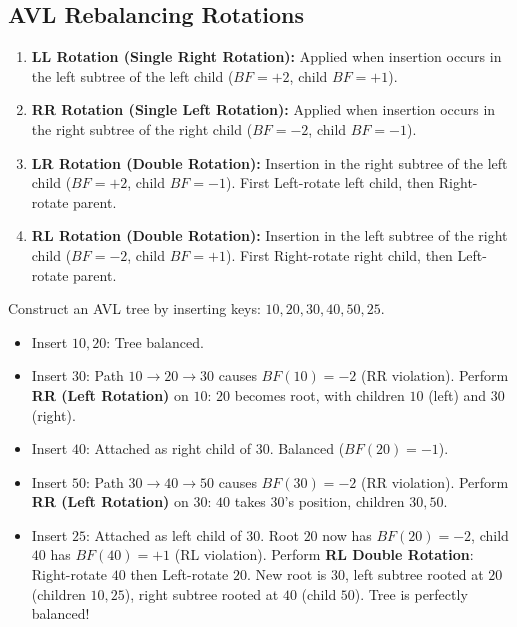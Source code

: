 \documentclass[12pt,a4paper]{article}
\begin{document}
\subsection{AVL Rebalancing Rotations}
\begin{enumerate}[leftmargin=*, itemsep=4pt]
  \item \textbf{LL Rotation (Single Right Rotation):} Applied when insertion occurs in the left subtree of the left child ($BF = +2$, child $BF = +1$).
  \item \textbf{RR Rotation (Single Left Rotation):} Applied when insertion occurs in the right subtree of the right child ($BF = -2$, child $BF = -1$).
  \item \textbf{LR Rotation (Double Rotation):} Insertion in the right subtree of the left child ($BF = +2$, child $BF = -1$). First Left-rotate left child, then Right-rotate parent.
  \item \textbf{RL Rotation (Double Rotation):} Insertion in the left subtree of the right child ($BF = -2$, child $BF = +1$). First Right-rotate right child, then Left-rotate parent.
\end{enumerate}

\begin{tcolorbox}[examplebox, title={\textbf{Step-by-Step AVL Construction Walkthrough}}]
Construct an AVL tree by inserting keys: $10, 20, 30, 40, 50, 25$.
\begin{itemize}[leftmargin=*, nosep]
  \item Insert $10, 20$: Tree balanced.
  \item Insert $30$: Path $10 \to 20 \to 30$ causes $BF(10) = -2$ (RR violation). Perform \textbf{RR (Left Rotation)} on $10$: $20$ becomes root, with children $10$ (left) and $30$ (right).
  \item Insert $40$: Attached as right child of $30$. Balanced ($BF(20)=-1$).
  \item Insert $50$: Path $30 \to 40 \to 50$ causes $BF(30) = -2$ (RR violation). Perform \textbf{RR (Left Rotation)} on $30$: $40$ takes $30$'s position, children $30, 50$.
  \item Insert $25$: Attached as left child of $30$. Root $20$ now has $BF(20) = -2$, child $40$ has $BF(40) = +1$ (RL violation). Perform \textbf{RL Double Rotation}: Right-rotate $40$ then Left-rotate $20$. New root is $30$, left subtree rooted at $20$ (children $10, 25$), right subtree rooted at $40$ (child $50$). Tree is perfectly balanced!
\end{itemize}
\end{tcolorbox}
\end{document}
